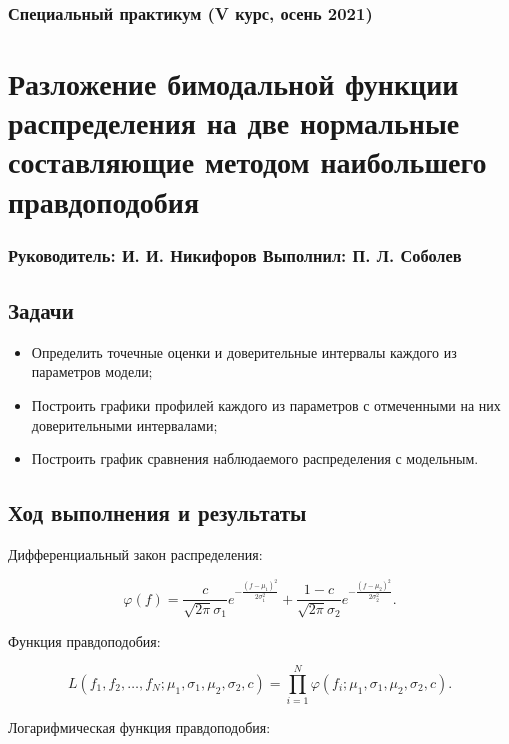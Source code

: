 \documentclass[a4paper, oneside]{article}
\newcommand{\sd}{\vspace{0.5em}}
\begin{document}
\subsubsection*{Специальный практикум (V курс, осень 2021)}
\section*{Разложение бимодальной функции распределения на две нормальные составляющие методом наибольшего правдоподобия}
\subsubsection*{Руководитель: И. И. Никифоров \hspace{2em} Выполнил: П. Л. Соболев}

\vspace{3em}

\subsection*{Задачи}

\begin{itemize}
  \setlength\itemsep{-0.1em}
  \item Определить точечные оценки и доверительные интервалы каждого из параметров модели;
  \item Построить графики профилей каждого из параметров с отмеченными на них доверительными интервалами;
  \item Построить график сравнения наблюдаемого распределения с модельным.
\end{itemize}

\subsection*{Ход выполнения и результаты}

Дифференциальный закон распределения:

$$
\varphi(f) = \frac{c}{\sqrt{2 \pi} \sigma_1} e^{\displaystyle -\frac{(f - \mu_1)^2}{2 \sigma_1^2}} + \frac{1 - c}{\sqrt{2 \pi} \sigma_2} e^{\displaystyle -\frac{(f - \mu_2)^2}{2 \sigma_2^2}}.
$$
\sd

Функция правдоподобия:

$$
L(f_1, f_2, \ldots, f_N; \mu_1, \sigma_1, \mu_2, \sigma_2, c) = \prod_{i=1}^{N} \varphi(f_i; \mu_1, \sigma_1, \mu_2, \sigma_2, c).
$$

Логарифмическая функция правдоподобия:
\end{document}
